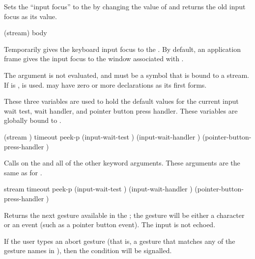 Sets the ``input focus'' to the   by
changing the value of  and returns the old input
focus as its value.

 {(stream) \body body}

Temporarily gives the keyboard input focus to the 
.  By default, an application frame gives the input focus to the
window associated with .

The  argument is not evaluated, and must be a symbol that is bound
to a stream.  If  is ,  is used.
 may have zero or more declarations as its first forms.



These three variables are used to hold the default values for the current input
wait test, wait handler, and pointer button press handler.  These variables are
globally bound to .


 {\key (stream )
                            timeout peek-p 
                            (input-wait-test )
                            (input-wait-handler )
                            (pointer-button-press-handler )}

Calls  on the  
and all of the other keyword arguments.  These arguments are the same as for
.

 {stream
                                   \key timeout peek-p 
                                        (input-wait-test )
                                        (input-wait-handler )
                                        (pointer-button-press-handler )}

Returns the next gesture available in the 
; the gesture will be either a character or an event (such as a
pointer button event).  The input is not echoed.

If the user types an abort gesture (that is, a gesture that matches any of the
gesture names in ), then the  condition
will be signalled.

